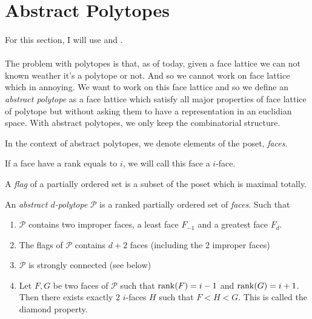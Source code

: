\section{Abstract Polytopes}

\paragraph{}
For this section, I will use \cite{abstractRegularPolytopes} and \cite{incidenceGeometry}.

\paragraph{}
The problem with polytopes is that, as of today, given a face lattice we can not known weather it's a polytope or not. And so we cannot work on face lattice which in annoying. We want to work on this face lattice and so we define an \textit{abstract polytope} as a face lattice which satisfy all major properties of face lattice of polytope but without asking them to have a representation in an euclidian space. With abstract polytopes, we only keep the combinatorial structure.



\begin{definition}
  In the context of abstract polytopes, we denote elements of the poset, \textit{faces}.
\end{definition}

\begin{definition}[$i$-face]
  If a face have a rank equals to $i$, we will call this face a $i$-face.
\end{definition}

\begin{definition}
  A \textit{flag} of a partially ordered set is a subset of the poset which is maximal totally.
\end{definition}

\begin{definition}
  An \textit{abstract $d$-polytope} $\mathcal P$ is a ranked partially ordered set of \textit{faces}. Such that
  \begin{enumerate}
    \item $\mathcal P$ contains two improper faces, a least face $F_{-1}$ and a greatest face $F_d$.
    \item The flags of $\mathcal P$ contains $d + 2$ faces (including the 2 improper faces)
    \item $\mathcal P$ is strongly connected (see below)
    \item Let $F, G$ be two faces of $\mathcal P$ such that $\operatorname{rank}(F) = i - 1$ and $\operatorname{rank}(G) = i + 1$. Then there exists exactly 2 $i$-faces $H$ such that $F < H < G$. This is called the diamond property.
  \end{enumerate}
\end{definition}


